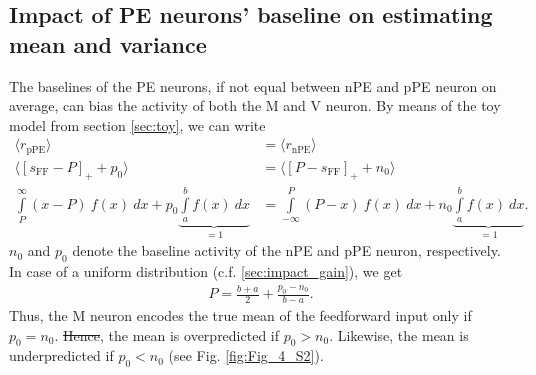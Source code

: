 \documentclass[10pt,a4paper]{article}
\providecommand{\DIFaddtex}[1]{{\protect\color{blue}\uwave{#1}}} %
\providecommand{\DIFdeltex}[1]{{\protect\color{red}\sout{#1}}}                      %
\providecommand{\DIFaddbegin}{} %
\providecommand{\DIFaddend}{} %
\providecommand{\DIFdelbegin}{} %
\providecommand{\DIFdelend}{} %
\providecommand{\DIFadd}[1]{\texorpdfstring{\DIFaddtex{#1}}{#1}} %
\providecommand{\DIFdel}[1]{\texorpdfstring{\DIFdeltex{#1}}{}} %
\newcommand{\DIFscaledelfig}{0.5}
\newlength{\DIFdelgraphicswidth} %
\newlength{\DIFdelgraphicsheight} %
\newcommand{\DIFaddincludegraphics}[2][]{{\color{blue}\fbox{\DIFOincludegraphics[#1]{#2}}}} %
\newcommand{\DIFdelincludegraphics}[2][]{%
\sbox{\DIFdelgraphicsbox}{\DIFOincludegraphics[#1]{#2}}%
\settoboxwidth{\DIFdelgraphicswidth}{\DIFdelgraphicsbox} %
\settoboxtotalheight{\DIFdelgraphicsheight}{\DIFdelgraphicsbox} %
\scalebox{\DIFscaledelfig}{%
\parbox[b]{\DIFdelgraphicswidth}{\usebox{\DIFdelgraphicsbox}\\[-\baselineskip] \rule{\DIFdelgraphicswidth}{0em}}\llap{\resizebox{\DIFdelgraphicswidth}{\DIFdelgraphicsheight}{%
\setlength{\unitlength}{\DIFdelgraphicswidth}%
\begin{picture}(1,1)%
\thicklines\linethickness{2pt} %
{\color[rgb]{1,0,0}\put(0,0){\framebox(1,1){}}}%
{\color[rgb]{1,0,0}\put(0,0){\line( 1,1){1}}}%
{\color[rgb]{1,0,0}\put(0,1){\line(1,-1){1}}}%
\end{picture}%
}\hspace*{3pt}}} %
} %
\DeclareRobustCommand{\DIFaddbegin}{\DIFOaddbegin \let\includegraphics\DIFaddincludegraphics} %
\DeclareRobustCommand{\DIFaddend}{\DIFOaddend \let\includegraphics\DIFOincludegraphics} %
\DeclareRobustCommand{\DIFdelbegin}{\DIFOdelbegin \let\includegraphics\DIFdelincludegraphics} %
\DeclareRobustCommand{\DIFdelend}{\DIFOaddend \let\includegraphics\DIFOincludegraphics} %
\begin{document}
\subsection{Impact of PE neurons' baseline on estimating mean and variance}\label{sec:impact_baseline} 
%
The baselines of the PE neurons, if not equal between \DIFaddbegin \DIFadd{the }\DIFaddend nPE and pPE neuron on average, can bias the activity of both the M and V neuron. By means of the toy model from section \ref{sec:toy}, we can write
%
\begin{align}
\label{eq:condition_baseline_mean}
\langle r_\mathrm{pPE} \rangle &= \langle r_\mathrm{nPE} \rangle \\
\langle \left[s_\mathrm{FF} - P\right]_+ + p_0\rangle &= \langle \left[P - s_\mathrm{FF}\right]_+ + n_0\rangle \nonumber\\
\int\limits_P^\infty (x - P)\ f(x)\ dx + p_0 \underbrace{\int\limits_a^b f(x)\ dx}_{=1}  &= \int\limits_{-\infty}^P (P - x)\ f(x)\ dx + n_0 \underbrace{\int\limits_a^b f(x)\ dx}_{=1} . \nonumber
\end{align}
%
$n_0$ and $p_0$ denote the baseline activity of the nPE and pPE neuron, respectively.
In case of a uniform distribution (c.f. \ref{sec:impact_gain}), we get 
%
%
\begin{align}
\label{eq:condition_baseline_mean_1}
P = \frac{b+a}{2} + \frac{p_0 - n_0}{b-a}.
\end{align}
%
Thus, the M neuron encodes the true mean of the feedforward input only if $p_0 = n_0$. \DIFdelbegin \DIFdel{Hence}\DIFdelend \DIFaddbegin \DIFadd{As a result}\DIFaddend , the mean is overpredicted if $p_0 > n_0$. Likewise, the mean is underpredicted if $p_0 < n_0$ (see Fig. \ref{fig:Fig_4_S2}).
\end{document}
